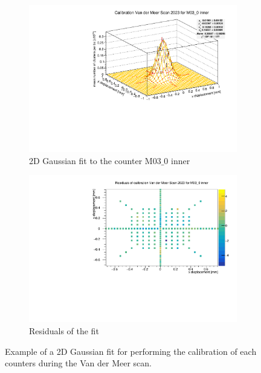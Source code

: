 \begin{figure}
    \centering
    \begin{subfigure}{0.48\textwidth}
    \includegraphics[width=\linewidth]{figures/M03_0.pdf}
    \caption{2D Gaussian fit to the counter M$03\_0$ inner}\label{fig:fit_M03}
    \end{subfigure}
    \begin{subfigure}{0.48\textwidth}
    \includegraphics[width=\linewidth]{figures/M03_0_res.pdf}
    \caption{Residuals of the fit}\label{fig:M03_res}
    \end{subfigure}
    \caption{Example of a 2D Gaussian fit for performing the calibration of each counters during the Van der Meer scan.}
    \label{fig:fit_example}
\end{figure}

